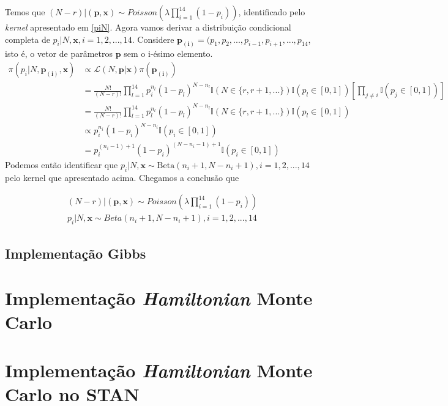 \documentclass[a4paper,12pt,twoside]{article}
\begin{document}
Temos que $(N-r)|(\mathbf{p,x})\sim Poisson(\lambda\prod_{i=1}^{14}(1-p_i))$, identificado pelo \textit{kernel} apresentado em \ref{piN}.
\newpage
\restoregeometry
Agora vamos derivar a distribuição condicional completa de $p_i|N,\mathbf{x}, i=1,2,...,14$. Considere $\mathbf{p_{(i)}}=(p_1,p_2,...,p_{i-1},p_{i+1},...,p_{14}$, isto é, o vetor de parâmetros $\mathbf{p}$ sem o i-ésimo elemento.
\begin{align*}
\pi(p_i|N,\mathbf{p_{(i)},x})&\propto \mathcal{L}(N,\mathbf{p}|\mathbf{x}) \pi(\mathbf{p_{(i)}})\\
& = \frac{N!}{(N-r)!}\prod_{l=1}^{14}p_{i}^{n_l}(1-p_l)^{N-n_l}\mathds{I}(N \in \{r,r+1,...\})\mathds{I}(p_l \in [0,1])\left[\prod_{j\neq i}\mathds{I}(p_j \in [0,1])\right]\\
& = \frac{N!}{(N-r)!}\prod_{l=1}^{14}p_{l}^{n_l}(1-p_l)^{N-n_l}\mathds{I}(N \in \{r,r+1,...\})\mathds{I}(p_l \in [0,1])\\
& \propto p_i^{n_i}(1-p_i)^{N-n_i}\mathds{I}(p_i \in [0,1])\\
& = p_i^{(n_i-1)+1}(1-p_i)^{(N-n_i-1)+1}\mathds{I}(p_i \in [0,1])
\end{align*}
Podemos então identificar que $p_i|N,\mathbf{x} \sim \text{Beta}(n_i+1,N-n_i+1), i=1,2,...,14$ pelo kernel que apresentado acima. Chegamos a conclusão que 

\begin{align}
& (N-r)|(\mathbf{p,x})\sim Poisson(\lambda\prod_{i=1}^{14}(1-p_i))\\
& p_i|N,\mathbf{x} \sim Beta(n_i+1,N-n_i+1), i=1,2,...,14
\end{align}

\subsection{Implementação Gibbs}


\newpage
\section{Implementação \textit{Hamiltonian} Monte Carlo}

\newpage
\section{Implementação \textit{Hamiltonian} Monte Carlo no STAN}
\end{document}
